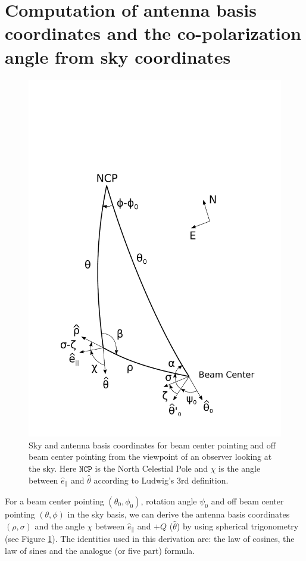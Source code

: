 \documentclass[a4paper,11pt]{article}
\newcommand{\co}{\mathbin{\|}}
\begin{document}
\appendix

\section{Computation of antenna basis coordinates and the co-polarization angle from sky coordinates}

\begin{figure}
	\centering
	\includegraphics[width=0.8\linewidth]{figures/Figure10_Lu3_3.pdf}
	\caption{Sky and antenna basis coordinates for beam center pointing and off beam center pointing from the viewpoint of an observer looking at the sky. Here $\mathrm{\texttt{NCP}}$ is the 
		     North Celestial Pole and $\chi$ is the angle between $\hat{e}_{\co}$ and $\hat{\theta}$ according to Ludwig's 3rd definition. }
	\label{fig::figure10}
\end{figure}
%
For a beam center pointing $(\theta_0, \phi_0)$, rotation angle $\psi_0$ and off beam center pointing $(\theta, \phi)$ in the sky basis, we can derive the antenna basis coordinates $(\rho,\sigma)$ and the angle $\chi$ between $\hat{e}_{\co}$ and $+Q$ ($\hat{\theta}$) by using spherical trigonometry (see Figure \ref{fig::figure10}). The identities used in this derivation are: the law of cosines, the law of sines and the analogue (or five part) formula.
\end{document}
